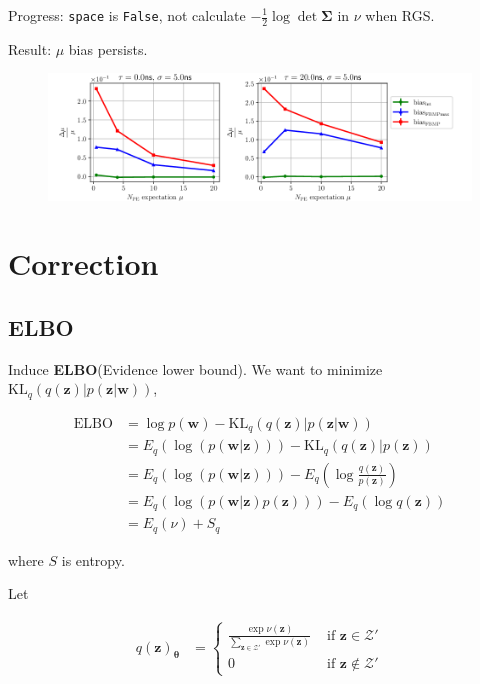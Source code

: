 \documentclass[notitlepage]{article}
\begin{document}
Progress: \texttt{space} is \texttt{False}, not calculate $-\frac{1}{2}\log\det\bm{\Sigma}$ in $\nu$ when RGS. 

Result: $\mu$ bias persists. 

\begin{figure}[H]
    \includegraphics[width=\textwidth]{vs-biasmu-nospaceprior.png}
\end{figure}

\section{Correction}

\subsection{ELBO}

Induce \textbf{ELBO}(Evidence lower bound). We want to minimize $\mathrm{KL}_q(q(\bm{z})|p(\bm{z}|\bm{w}))$, 

\begin{align}
    \mathrm{ELBO} &= \log p(\bm{w}) - \mathrm{KL}_q(q(\bm{z})|p(\bm{z}|\bm{w})) \\
    &= E_q(\log(p(\bm{w}|\bm{z}))) - \mathrm{KL}_q(q(\bm{z})|p(\bm{z})) \\
    &= E_q(\log(p(\bm{w}|\bm{z}))) - E_q(\log\frac{q(\bm{z})}{p(\bm{z})}) \\
    &= E_q(\log(p(\bm{w}|\bm{z})p(\bm{z}))) - E_q(\log q(\bm{z})) \\
    &= E_q(\nu) + S_q
\end{align}

where $S$ is entropy. 

Let

\begin{align}
    q(\bm{z})_{\bm{\theta}} &= \begin{cases}
        \frac{\exp\nu(\bm{z})}{\sum_{\bm{z}\in\mathcal{Z}'}\exp\nu(\bm{z})} & \text{ if } \bm{z} \in \mathcal{Z}' \\ 
        0 & \text{ if } \bm{z} \notin \mathcal{Z}'
    \end{cases}
\end{align}
\end{document}
